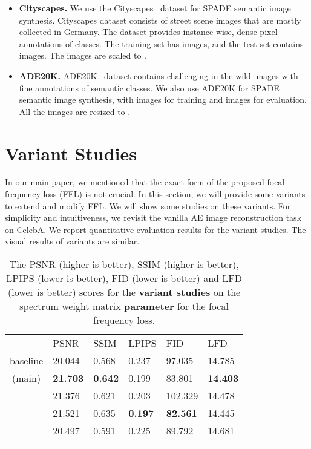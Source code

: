 \documentclass[10pt,twocolumn,letterpaper]{article}
\begin{document}
\begin{itemize}
	\item \textbf{Cityscapes.} We use the Cityscapes~\cite{cityscapes} dataset for SPADE semantic image synthesis. Cityscapes dataset consists of street scene images that are mostly collected in Germany. The dataset provides instance-wise, dense pixel annotations of  classes. The training set has  images, and the test set contains  images. The images are scaled to .

	\item \textbf{ADE20K.} ADE20K~\cite{ade20k} dataset contains challenging in-the-wild images with fine annotations of  semantic classes. We also use ADE20K for SPADE semantic image synthesis, with  images for training and  images for evaluation. All the images are resized to .
\end{itemize}



\section{Variant Studies}
\label{sec:variants}

In our main paper, we mentioned that the exact form of the proposed focal frequency loss (FFL) is not crucial. In this section, we will provide some variants to extend and modify FFL. We will show some studies on these variants.
For simplicity and intuitiveness, we revisit the vanilla AE image reconstruction task on CelebA.
We report quantitative evaluation results for the variant studies. The visual results of variants are similar.


\begin{table}[tb!]
\centering
\footnotesize
\caption{The PSNR (higher is better), SSIM (higher is better), LPIPS (lower is better), FID (lower is better) and LFD (lower is better) scores for the \textbf{variant studies} on the spectrum weight matrix \textbf{parameter}  for the focal frequency loss.}
\begin{tabularx}{\linewidth}{c|*{5}{|Y}}
\Xhline{1pt}
 & PSNR& SSIM& LPIPS& FID& LFD \\
\Xhline{0.6pt}
baseline & 20.044& 0.568& 0.237& 97.035& 14.785 \\
\Xhline{0.4pt}
 (main) & {\bf21.703}& {\bf0.642}& 0.199& 83.801& {\bf14.403} \\
 & 21.376& 0.621& 0.203& 102.329& 14.478 \\
 & 21.521& 0.635& {\bf0.197}& {\bf82.561}& 14.445 \\
 & 20.497& 0.591& 0.225& 89.792& 14.681 \\
\Xhline{1pt}
\end{tabularx}
\label{tbl:variantsalpha}
\end{table}
\end{document}
